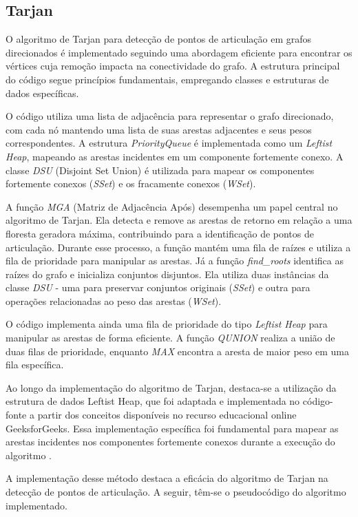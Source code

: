 \documentclass[12pt]{article}
\begin{document}
\subsection{Tarjan}

O algoritmo de Tarjan para detecção de pontos de articulação em grafos direcionados é implementado seguindo uma abordagem eficiente para encontrar os vértices cuja remoção impacta na conectividade do grafo. A estrutura principal do código segue princípios fundamentais, empregando classes e estruturas de dados específicas.

O código utiliza uma lista de adjacência para representar o grafo direcionado, com cada nó mantendo uma lista de suas arestas adjacentes e seus pesos correspondentes. A estrutura \textit{PriorityQueue} é implementada como um \textit{Leftist Heap}, mapeando as arestas incidentes em um componente fortemente conexo. A classe \textit{DSU} (Disjoint Set Union) é utilizada para mapear os componentes fortemente conexos (\textit{SSet}) e os fracamente conexos (\textit{WSet}).

A função \textit{MGA} (Matriz de Adjacência Após) desempenha um papel central no algoritmo de Tarjan. Ela detecta e remove as arestas de retorno em relação a uma floresta geradora máxima, contribuindo para a identificação de pontos de articulação. Durante esse processo, a função mantém uma fila de raízes e utiliza a fila de prioridade para manipular as arestas. Já a função \textit{find\_roots} identifica as raízes do grafo e inicializa conjuntos disjuntos. Ela utiliza duas instâncias da classe \textit{DSU} - uma para preservar conjuntos originais (\textit{SSet}) e outra para operações relacionadas ao peso das arestas (\textit{WSet}).

O código implementa ainda uma fila de prioridade do tipo \textit{Leftist Heap} para manipular as arestas de forma eficiente. A função \textit{QUNION} realiza a união de duas filas de prioridade, enquanto \textit{MAX} encontra a aresta de maior peso em uma fila específica.

Ao longo da implementação do algoritmo de Tarjan, destaca-se a utilização da estrutura de dados Leftist Heap, que foi adaptada e implementada no código-fonte a partir dos conceitos disponíveis no recurso educacional online GeeksforGeeks. Essa implementação específica foi fundamental para mapear as arestas incidentes nos componentes fortemente conexos durante a execução do algoritmo \cite{geeksforgeeks}. 

A implementação desse método destaca a eficácia do algoritmo de Tarjan na detecção de pontos de articulação. A seguir, têm-se o pseudocódigo do algoritmo implementado.
 
\end{document}

